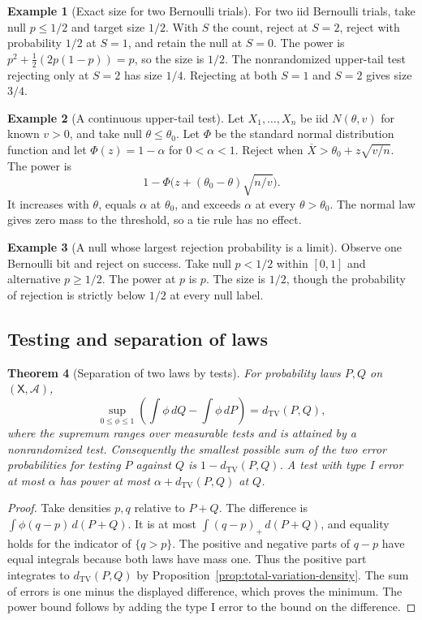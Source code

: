 \documentclass[11pt,oneside]{book}
\newtheorem{theorem}{Theorem}[chapter]
\theoremstyle{definition}
\newtheorem{example}[theorem]{Example}
\theoremstyle{remark}
\begin{document}
\begin{example}[Exact size for two Bernoulli trials]
\label{ex:test-binomial-randomized-tie}
For two iid Bernoulli trials, take null $p\leq1/2$ and target
size $1/2$. With $S$ the count, reject at $S=2$, reject with
probability $1/2$ at $S=1$, and retain the null at $S=0$.
The power is $p^2+\tfrac12(2p(1-p))=p$, so the size is $1/2$.
The nonrandomized upper-tail test rejecting only at $S=2$
has size $1/4$. Rejecting at both $S=1$ and $S=2$ gives size
$3/4$.
\end{example}

\begin{example}[A continuous upper-tail test]
\label{ex:test-normal-upper-tail}
Let $X_1,\ldots,X_n$ be iid $N(\theta,v)$ for known $v>0$,
and take null $\theta\leq\theta_0$. Let $\Phi$ be the standard
normal distribution function and let $\Phi(z)=1-\alpha$ for
$0<\alpha<1$. Reject when
$\overline X>\theta_0+z\sqrt{v/n}$. The power is
\[
1-\Phi\bigl(z+(\theta_0-\theta)\sqrt{n/v}\bigr).
\]
It increases with $\theta$, equals $\alpha$ at $\theta_0$,
and exceeds $\alpha$ at every $\theta>\theta_0$. The normal
law gives zero mass to the threshold, so a tie rule has no
effect.
\end{example}

\begin{example}[A null whose largest rejection probability is a limit]
\label{ex:test-open-null-size}
Observe one Bernoulli bit and reject on success. Take null
$p<1/2$ within $[0,1]$ and alternative $p\geq1/2$. The power
at $p$ is $p$. The size is $1/2$, though the probability of
rejection is strictly below $1/2$ at every null label.
\end{example}

\subsection{Testing and separation of laws}
\label{subsec:test-separation-laws}

\begin{theorem}[Separation of two laws by tests]
\label{thm:test-total-variation-gap}
For probability laws $P,Q$ on $(\mathsf X,\mathcal A)$,
\[
\sup_{0\leq\phi\leq1}\left(\int\phi\,dQ-\int\phi\,dP\right)
=d_{\mathrm{TV}}(P,Q),
\]
where the supremum ranges over measurable tests and is attained by
a nonrandomized test. Consequently the smallest possible sum
of the two error probabilities for testing $P$ against $Q$ is
$1-d_{\mathrm{TV}}(P,Q)$. A test with type I error at most $\alpha$
has power at most $\alpha+d_{\mathrm{TV}}(P,Q)$ at $Q$.
\end{theorem}
\begin{proof}
Take densities $p,q$ relative to $P+Q$. The difference is
$\int\phi(q-p)\,d(P+Q)$. It is at most
$\int(q-p)_+\,d(P+Q)$, and equality holds for the indicator
of $\{q>p\}$. The positive and negative parts of $q-p$ have
equal integrals because both laws have mass one. Thus the positive
part integrates to $d_{\mathrm{TV}}(P,Q)$ by
Proposition~\ref{prop:total-variation-density}.
The sum of errors is one minus the displayed difference, which
proves the minimum. The power bound follows by adding the type I
error to the bound on the difference.
\end{proof}
\end{document}

